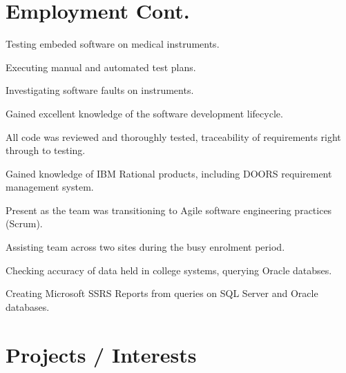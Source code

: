 \documentclass[a4paper]{deedy-resume} %
\begin{document}
\begin{minipage}[t]{0.66\textwidth} %

\section{Employment Cont.}


\vspace{\topsep}
\begin{tightitemize}
\item Testing embeded software on medical instruments.
\item Executing manual and automated test plans.
\item Investigating software faults on instruments.
\item Gained excellent knowledge of the software development lifecycle. 
\item All code was reviewed and thoroughly tested, traceability of requirements right through to testing.
\item Gained knowledge of IBM Rational products, including DOORS requirement management system.
\item Present as the team was transitioning to Agile software engineering practices (Scrum).
\end{tightitemize}

\sectionspace %


\begin{tightitemize}
\item Assisting team across two sites during the busy enrolment period.
\item Checking accuracy of data held in college systems, querying Oracle databses.
\item Creating Microsoft SSRS Reports from queries on SQL Server and Oracle databases.
\end{tightitemize}
\sectionspace %


\section{Projects / Interests}


\end{minipage}
\end{document}
